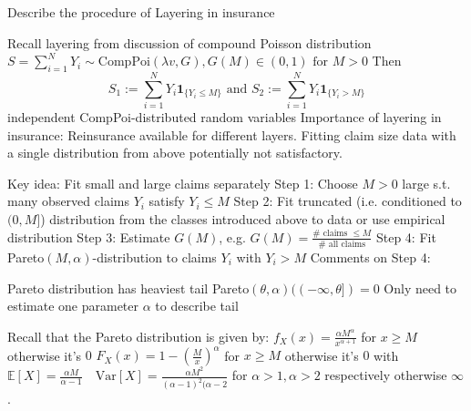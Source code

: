 Describe the procedure of Layering in insurance

Recall layering from discussion of compound Poisson distribution
\(S = \sum_{i=1}^N Y_i \sim \text{CompPoi}(\lambda v, G), G(M) \in (0, 1) \text{ for } M > 0\)
Then
\[
S_1 := \sum_{i=1}^N Y_i \mathbf{1}_{\{Y_i \le M\}} \text{ and } S_2 := \sum_{i=1}^N Y_i \mathbf{1}_{\{Y_i > M\}}
\]
independent CompPoi-distributed random variables
Importance of layering in insurance: Reinsurance available for different layers.
Fitting claim size data with a single distribution from above potentially not
satisfactory.

Key idea: Fit small and large claims separately
Step 1: Choose \(M > 0\) large s.t. many observed claims \(Y_i\) satisfy \(Y_i \le M\)
Step 2: Fit truncated (i.e. conditioned to \((0, M]\)) distribution from the classes introduced above to data or use empirical distribution
Step 3: Estimate \(G(M)\), e.g. \(G(M) = \frac{\# \text{ claims } \le M}{\# \text{ all claims}}\)
Step 4: Fit Pareto\((M, \alpha)\)-distribution to claims \(Y_i\) with \(Y_i > M\)
Comments on Step 4:

Pareto distribution has heaviest tail
Pareto\((\theta, \alpha)((-\infty, \theta]) = 0\)
Only need to estimate one parameter \(\alpha\) to describe tail

Recall that the Pareto distribution is given by:
\( f_X(x) = \frac{\alpha M^\alpha}{x^{\alpha+1}} \) for \( x \geq M \) otherwise it's \( 0 \)
\( F_X(x) = 1 - (\frac{M}{x})^\alpha \) for \( x \geq M \) otherwise it's \( 0 \)
with
\( \mathbb{E}[X] = \frac{\alpha M}{\alpha - 1} \quad \text{Var}[X] = \frac{\alpha M^2}{(\alpha - 1)^2(\alpha - 2}\) 
for \( \alpha > 1, \alpha > 2 \) respectively otherwise \( \infty \).
